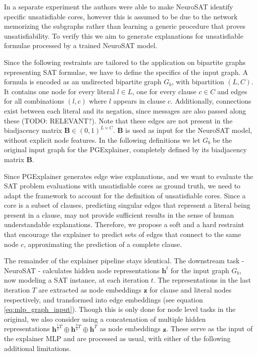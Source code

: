 In a separate experiment the authors were able to make NeuroSAT identify specific unsatisfiable cores, however this is assumed to be due to the network memorizing the subgraphs rather than learning a generic procedure that proves unsatisfiability. To verify this we aim to generate explanations for unsatisfiable formulae processed by a trained NeuroSAT model.

Since the following restraints are tailored to the application on bipartite graphs representing SAT formulae, we have to define the specifics of the input graph. A formula is encoded as an undirected bipartite graph $G_b$, with bipartition $(L,C)$. It contains one node for every literal $l \in L$, one for every clause $c \in C$ and edges for all combinations $(l,c)$ where $l$ appears in clause $c$. Additionally, connections exist between each literal and its negation, since messages are also passed along these (TODO: RELEVANT?). Note that these edges are not present in the biadjacency matrix $\mathbf{B}\in (0,1)^{L\times C}$. $\mathbf{B}$ is used as input for the NeuroSAT model, without explicit node features. In the following definitions we let $G_b$ be the original input graph for the PGExplainer, completely defined by its biadjacency matrix $\mathbf{B}$.


Since PGExplainer generates edge wise explanations, and we want to evaluate the SAT problem evaluations with unsatisfiable cores as ground truth, we need to adapt the framework to account for the definition of unsatisfiable cores. Since a core is a subset of clauses, predicting singular edges that represent a literal being present in a clause, may not provide sufficient results in the sense of human understandable explanations. Therefore, we propose a soft and a hard restraint that encourage the explainer to predict sets of edges that connect to the same node $c$, approximating the prediction of a complete clause.

The remainder of the explainer pipeline stays identical. The downstream task - NeuroSAT - calculates hidden node representations $\mathbf{h}^t$ for the input graph $G_b$, now modeling a SAT instance, at each iteration $t$. The representations in the last iteration $T$ are extracted as node embeddings $\mathbf{z}$ for clause and literal nodes respectively, and transformed into edge embeddings (see equation \ref{eq:mlp_graph_input}). Though this is only done for node level tasks in the original, we also consider using a concatenation of multiple hidden representations $\mathbf{h}^{\frac{1}{2}T} \oplus \mathbf{h}^{\frac{3}{4}T} \oplus \mathbf{h}^T$ as node embeddings $\mathbf{z}$. These serve as the input of the explainer MLP and are processed as usual, with either of the following additional limitations. \bigskip


